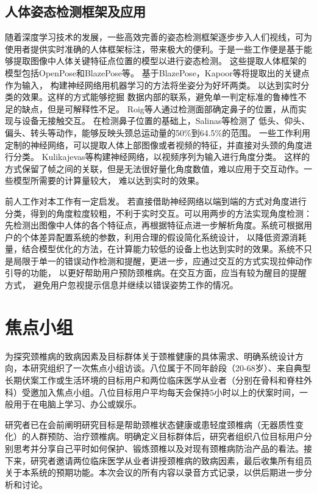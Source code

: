 \documentclass[12pt,a4paper]{article}%
\begin{document}
\subsection{人体姿态检测框架及应用}
随着深度学习技术的发展，一些高效完善的姿态检测框架逐步步入人们视线，可为使用者提供实时准确的人体框架标注，带来极大的便利。于是一些工作便是基于能够提取图像中人体关键特征点位置的模型以进行姿态检测。
这些提取人体框架的模型包括OpenPose\cite{cao2017realtime}和BlazePose\cite{bazarevsky2020blazepose}等。
基于BlazePose，Kapoor等将提取出的关键点作为输入，
构建神经网络用机器学习的方法将坐姿分为好坏两类。
以达到实时分类的效果。这样的方式能够挖掘
数据内部的联系，避免单一判定标准的鲁棒性不足的缺点，但是可解释性不足。
Roig等人通过检测面部确定鼻子的位置，从而实现与设备无接触交互\cite{roig2016robust}。
在检测鼻子位置的基础上，Salinas等检测了
低头、仰头、偏头、转头等动作，能够反映头颈总运动量的50\%到64.5\%的范围\cite{salinas2021camera}。
一些工作利用定制的神经网络，可以提取人体上部图像或者视频的特征，并直接对头颈的角度进行分类。
Kulikajevas等构建神经网络，以视频序列为输入进行角度分类\cite{kulikajevas2021detection}。
这样的方式保留了帧之间的关联，但是无法很好量化角度数值，难以应用于交互动作。一些模型所需要的计算量较大，
难以达到实时的效果。
\par
前人工作对本工作有一定启发。
若直接借助神经网络以端到端的方式对角度进行分类，得到的角度粒度较粗，不利于实时交互。可以用两步的方法实现角度检测：
先检测出图像中人体的各个特征点，再根据特征点进一步解析角度。系统可根据用户的个体差异配置系统的参数，利用合理的假设简化系统设计，
以降低资源消耗量，结合模型优化的方法，在计算能力较低的设备上也达到实时的效果。系统不只是局限于单一的错误动作检测和提醒，更进一步，应通过交互的方式实现拉伸动作引导的功能，
以更好帮助用户预防颈椎病。在交互方面，应当有较为醒目的提醒方式，
避免用户忽视提示信息并继续以错误姿势工作的情况。

\section{焦点小组}
为探究颈椎病的致病因素及目标群体关于颈椎健康的具体需求、明确系统设计方向，本研究组织了一次焦点小组访谈。八位属于不同年龄段（20-68岁）、来自典型长期伏案工作或生活环境的目标用户和两位临床医学从业者（分别在骨科和脊柱外科）受邀加入焦点小组。八位目标用户平均每天会保持5小时以上的伏案时间，一般用于在电脑上学习、办公或娱乐。


研究者已在会前阐明研究目标是帮助颈椎状态健康或患轻度颈椎病（无器质性变化）的人群预防、治疗颈椎病。明确定义目标群体后，研究者组织八位目标用户分别思考并分享自己平时如何保护、锻炼颈椎以及对现有颈椎病防治产品的看法。接下来，研究者邀请两位临床医学从业者讲授颈椎病的致病因素，最后收集所有组员关于本系统的预期功能。本次会议的所有内容以录音方式记录，以供后期进一步分析和讨论。
\end{document}

